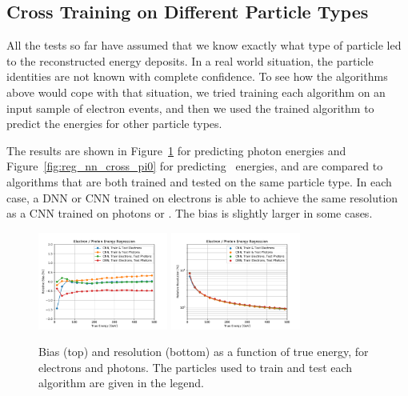 \subsection*{Cross Training on Different Particle Types}

All the tests so far have assumed that we know exactly what type of particle led to the reconstructed energy deposits.  In a real world situation, the particle identities are not known with complete confidence.  To see how the algorithms above would cope with that situation, we tried training each algorithm on an input sample of electron events, and then we used the trained algorithm to predict the energies for other particle types.

The results are shown in Figure~\ref{fig:reg_nn_cross_gamma} for predicting photon energies and Figure~\ref{fig:reg_nn_cross_pi0} for predicting \pizero\ energies, and are compared to algorithms that are both trained and tested on the same particle type.  In each case, a DNN or CNN trained on electrons is able to achieve the same resolution as a CNN trained on photons or \pizero.  The bias is slightly larger in some cases.

\begin{figure}[hbp]
\centering
\includegraphics[width=0.38\textwidth]{Images/Calo/bias_vs_E_EleGammaFixed_nn_cross_zoom.pdf}
\includegraphics[width=0.38\textwidth]{Images/Calo/res_vs_E_EleGammaFixed_nn_cross_fits.pdf}
\caption{Bias (top) and resolution (bottom) as a function of true energy, for electrons and photons.  The particles used to train and test each algorithm are given in the legend.
}
\label{fig:reg_nn_cross_gamma}
\end{figure}

